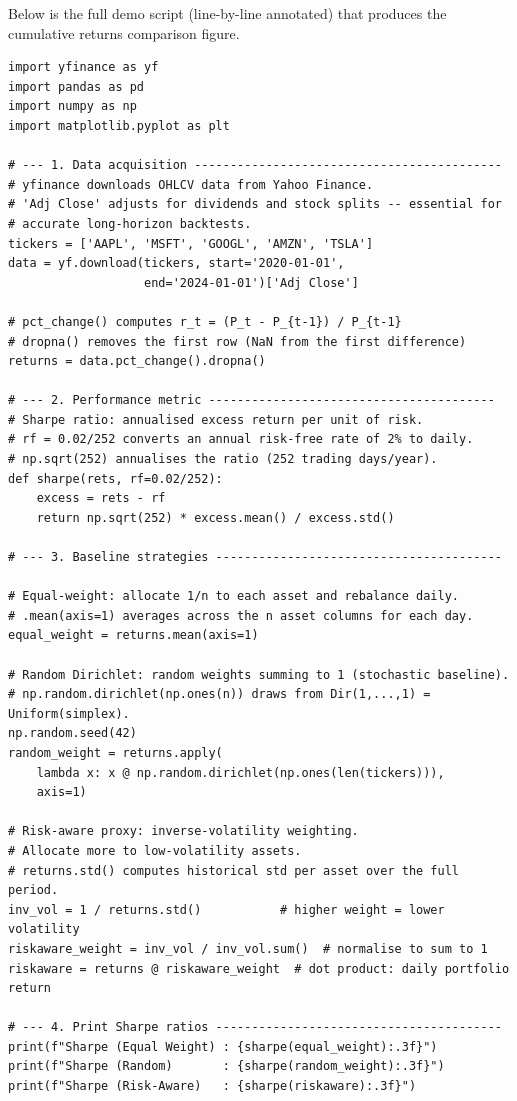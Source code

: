 \documentclass[12pt,a4paper]{article}
\begin{document}
Below is the full demo script (line-by-line annotated) that produces the
cumulative returns comparison figure.

\begin{lstlisting}[caption={Full annotated portfolio comparison demo},label={lst:fulldemo}]
import yfinance as yf
import pandas as pd
import numpy as np
import matplotlib.pyplot as plt

# --- 1. Data acquisition -------------------------------------------
# yfinance downloads OHLCV data from Yahoo Finance.
# 'Adj Close' adjusts for dividends and stock splits -- essential for
# accurate long-horizon backtests.
tickers = ['AAPL', 'MSFT', 'GOOGL', 'AMZN', 'TSLA']
data = yf.download(tickers, start='2020-01-01',
                   end='2024-01-01')['Adj Close']

# pct_change() computes r_t = (P_t - P_{t-1}) / P_{t-1}
# dropna() removes the first row (NaN from the first difference)
returns = data.pct_change().dropna()

# --- 2. Performance metric ----------------------------------------
# Sharpe ratio: annualised excess return per unit of risk.
# rf = 0.02/252 converts an annual risk-free rate of 2% to daily.
# np.sqrt(252) annualises the ratio (252 trading days/year).
def sharpe(rets, rf=0.02/252):
    excess = rets - rf
    return np.sqrt(252) * excess.mean() / excess.std()

# --- 3. Baseline strategies ----------------------------------------

# Equal-weight: allocate 1/n to each asset and rebalance daily.
# .mean(axis=1) averages across the n asset columns for each day.
equal_weight = returns.mean(axis=1)

# Random Dirichlet: random weights summing to 1 (stochastic baseline).
# np.random.dirichlet(np.ones(n)) draws from Dir(1,...,1) = Uniform(simplex).
np.random.seed(42)
random_weight = returns.apply(
    lambda x: x @ np.random.dirichlet(np.ones(len(tickers))),
    axis=1)

# Risk-aware proxy: inverse-volatility weighting.
# Allocate more to low-volatility assets.
# returns.std() computes historical std per asset over the full period.
inv_vol = 1 / returns.std()           # higher weight = lower volatility
riskaware_weight = inv_vol / inv_vol.sum()  # normalise to sum to 1
riskaware = returns @ riskaware_weight  # dot product: daily portfolio return

# --- 4. Print Sharpe ratios ----------------------------------------
print(f"Sharpe (Equal Weight) : {sharpe(equal_weight):.3f}")
print(f"Sharpe (Random)       : {sharpe(random_weight):.3f}")
print(f"Sharpe (Risk-Aware)   : {sharpe(riskaware):.3f}")


\end{lstlisting}
\end{document}
